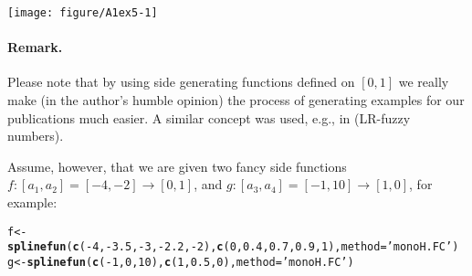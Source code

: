 \documentclass[11pt]{article}\usepackage[]{graphicx}\usepackage[]{color}
\makeatletter
\newcommand{\hlnum}[1]{\textcolor[rgb]{0.686,0.059,0.569}{#1}}%
\newcommand{\hlstr}[1]{\textcolor[rgb]{0.192,0.494,0.8}{#1}}%
\newcommand{\hlopt}[1]{\textcolor[rgb]{0,0,0}{#1}}%
\newcommand{\hlstd}[1]{\textcolor[rgb]{0.345,0.345,0.345}{#1}}%
\newcommand{\hlkwb}[1]{\textcolor[rgb]{0.69,0.353,0.396}{#1}}%
\newcommand{\hlkwc}[1]{\textcolor[rgb]{0.333,0.667,0.333}{#1}}%
\newcommand{\hlkwd}[1]{\textcolor[rgb]{0.737,0.353,0.396}{\textbf{#1}}}%
\newenvironment{kframe}{%
 \def\at@end@of@kframe{}%
 \ifinner\ifhmode%
  \def\at@end@of@kframe{\end{minipage}}%
  \begin{minipage}{\columnwidth}%
 \fi\fi%
 \def\FrameCommand##1{\hskip\@totalleftmargin \hskip-\fboxsep
 \colorbox{shadecolor}{##1}\hskip-\fboxsep
     \hskip-\linewidth \hskip-\@totalleftmargin \hskip\columnwidth}%
 \MakeFramed {\advance\hsize-\width
   \@totalleftmargin\z@ \linewidth\hsize
   \@setminipage}}%
 {\par\unskip\endMakeFramed%
 \at@end@of@kframe}
\newenvironment{knitrout}{}{} %
\makeatother
\begin{document}
\begin{center}
\begin{knitrout}\small
{}\color{fgcolor}

{\centering \texttt{[image: figure/A1ex5-1]} 

}



\end{knitrout}
\end{center}







\paragraph{Remark.}
Please note that by using side generating functions defined on $[0,1]$
we really make (in the author's humble opinion) the process of generating
examples for our publications much easier.
A similar concept was used, e.g., in \cite{StefaniniSorini2009:eusflat}
(LR-fuzzy numbers).

Assume, however, that we are given two fancy side
functions $f: [a_1,a_2]=[-4,-2]\to[0,1]$,
and $g: [a_3,a_4]=[-1,10]\to[1,0]$,
for example:

\begin{knitrout}\small
{}\color{fgcolor}\begin{kframe}
\begin{alltt}
\hlstd{f} \hlkwb{<-} \hlkwd{splinefun}\hlstd{(}\hlkwd{c}\hlstd{(}\hlopt{-}\hlnum{4}\hlstd{,}\hlopt{-}\hlnum{3.5}\hlstd{,}\hlopt{-}\hlnum{3}\hlstd{,}\hlopt{-}\hlnum{2.2}\hlstd{,}\hlopt{-}\hlnum{2}\hlstd{),} \hlkwd{c}\hlstd{(}\hlnum{0}\hlstd{,}\hlnum{0.4}\hlstd{,}\hlnum{0.7}\hlstd{,}\hlnum{0.9}\hlstd{,}\hlnum{1}\hlstd{),} \hlkwc{method}\hlstd{=}\hlstr{'monoH.FC'}\hlstd{)}
\hlstd{g} \hlkwb{<-} \hlkwd{splinefun}\hlstd{(}\hlkwd{c}\hlstd{(}\hlopt{-}\hlnum{1}\hlstd{,}\hlnum{0}\hlstd{,}\hlnum{10}\hlstd{),} \hlkwd{c}\hlstd{(}\hlnum{1}\hlstd{,}\hlnum{0.5}\hlstd{,}\hlnum{0}\hlstd{),} \hlkwc{method}\hlstd{=}\hlstr{'monoH.FC'}\hlstd{)}
\end{alltt}
\end{kframe}
\end{knitrout}
\end{document}
